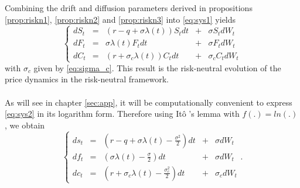 \documentclass{article}
\theoremstyle{definition}
\theoremstyle{remark}
\newcommand{\Ito}{It\^{o} }
\begin{document}
Combining the drift and diffusion parameters derived in propositions \ref{prop:riskn1}, \ref{prop:riskn2} and \ref{prop:riskn3} into \eqref{eq:sys1} yields
\begin{equation}\label{eq:sys2}
\boxed{
\left\{ \begin{array}{lcrcr}
          dS_t & = & (r-q+\sigma\lambda(t))S_t dt & + & \sigma S_t dW_t \\ 
          dF_t & = & \sigma\lambda(t) F_tdt & + & \sigma F_tdW_t \\ 
          dC_t & = & (r+\sigma_c\lambda(t))C_tdt & + & \sigma_c C_tdW_t 
        \end{array} \right. 
}
\end{equation}
with $\sigma_c$ given by \eqref{eq:sigma_c}. This result is the risk-neutral evolution of the price dynamics in the risk-neutral framework.\\
\\
As will see in chapter \ref{sec:app}, it will be computationally convenient to express \eqref{eq:sys2} in its logarithm form. 
Therefore using \Ito's lemma with $f(.)=ln(.)$, we obtain
\begin{equation}\label{eq:sys3}
\boxed{
\left\{ \begin{array}{lcrcr}
          ds_t & = & (r-q+\sigma\lambda(t)-\frac{\sigma^2}{2}) dt & + & \sigma dW_t \\ 
          df_t & = & (\sigma\lambda(t)-\frac{\sigma}{2}) dt & + & \sigma dW_t \\ 
          dc_t & = & (r+\sigma_c\lambda(t)-\frac{\sigma_c^2}{2})dt & + & \sigma_c dW_t 
        \end{array} \right. .
}
\end{equation}
\end{document}
